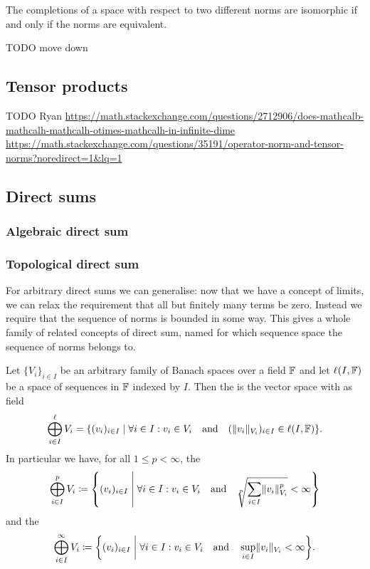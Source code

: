 \begin{proposition}
The completions of a space with respect to two different norms are isomorphic \textup{if and only if} the norms are equivalent.
\end{proposition}

TODO move down
\subsection{Tensor products}
TODO Ryan
\url{https://math.stackexchange.com/questions/2712906/does-mathcalb-mathcalh-mathcalh-otimes-mathcalh-in-infinite-dime}
\url{https://math.stackexchange.com/questions/35191/operator-norm-and-tensor-norms?noredirect=1&lq=1}

\subsection{Direct sums}
\subsubsection{Algebraic direct sum}

\subsubsection{Topological direct sum}
For arbitrary direct sums we can generalise: now that we have a concept of limits, we can relax the requirement that all but finitely many terms be zero. Instead we require that the sequence of norms is bounded in some way. This gives a whole family of related concepts of direct sum, named for which sequence space the sequence of norms belongs to.
\begin{definition}
Let $\{V_i\}_{i\in I}$ be an arbitrary family of Banach spaces over a field $\mathbb{F}$ and let $\ell(I,\mathbb{F})$ be a space of sequences in $\mathbb{F}$ indexed by $I$. Then the  is the vector space with as field
\[ \bigoplus_{i\in I}^\ell V_i = \setbuilder{(v_i)_{i\in I}}{\forall i\in I: v_i\in V_i \quad\text{and}\quad (\norm{v_i}_{V_i})_{i\in I}\in \ell(I,\F) }. \]
In particular we have, for all $1\leq p<\infty$, the 
\[ \bigoplus_{i\in I}^p V_i \defeq \setbuilder{(v_i)_{i\in I}}{\forall i\in I: v_i\in V_i \quad\text{and}\quad \sqrt[p]{\sum_{i\in I}\norm{v_i}_{V_i}^p}<\infty} \]
and the 
\[ \bigoplus_{i\in I}^\infty V_i \defeq \setbuilder{(v_i)_{i\in I}}{\forall i\in I: v_i\in V_i \quad\text{and}\quad \sup_{i\in I}\norm{v_i}_{V_i}<\infty}. \]
\end{definition}

